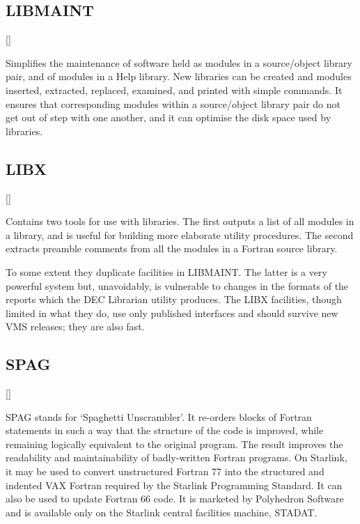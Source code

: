 \subsection{LIBMAINT}

\vspace{-10mm}

\hfill []

\vspace{2mm}

Simplifies the maintenance of software held as modules in a source/object
library pair, and of modules in a Help library.
New libraries can be created and modules inserted, extracted, replaced,
examined, and printed with simple commands.
It ensures that corresponding modules within a source/object library pair do not
get out of step with one another, and it can optimise the disk space used by
libraries.

\subsection{LIBX}

\vspace{-10mm}

\hfill []

\vspace{2mm}

Contains two tools for use with libraries.
The first outputs a list of all modules in a library, and is useful for building
more elaborate utility procedures.
The second extracts preamble comments from all the modules in a Fortran
source library.

To some extent they duplicate facilities in LIBMAINT.
The latter is a very powerful system but, unavoidably, is vulnerable to
changes in the formats of the reports which the DEC Librarian utility produces.
The LIBX facilities, though limited in what they do, use only published
interfaces and should survive new VMS releases; they are also fast.

\subsection{SPAG}

\vspace{-10mm}

\hfill []

\vspace{2mm}

SPAG stands for `Spaghetti Unscrambler'.
It re-orders blocks of Fortran statements in such a way that the structure of
the code is improved, while remaining logically equivalent to the original
program.
The result improves the readability and maintainability of badly-written
Fortran programs.
On Starlink, it may be used to convert unstructured Fortran 77 into the
structured and indented VAX Fortran required by the Starlink Programming
Standard.
It can also be used to update Fortran 66 code.
It is marketed by Polyhedron Software and is available only on the Starlink
central facilities machine, STADAT.

